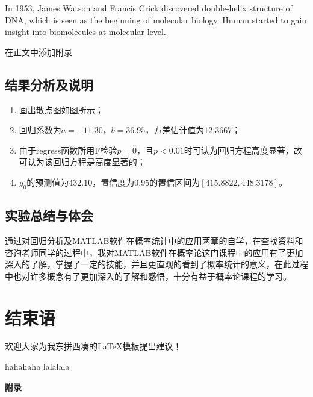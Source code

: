 \documentclass[UTF8,12pt,a4paper]{article}
\begin{document}
In 1953, James Watson and Francis Crick discovered double-helix structure of DNA, which is seen as the beginning of molecular biology. Human started to gain insight into biomolecules at molecular level.

\begin{appendices}
在正文中添加附录
\end{appendices}

\subsection{结果分析及说明}
\begin{enumerate}
	\item 画出散点图如图所示；
	\item 回归系数为$a=-11.30$，$b=36.95$，方差估计值为$12.3667$；
	\item 由于regress函数所用F检验$p=0$，且$p<0.01$时可认为回归方程高度显著，故可认为该回归方程是高度显著的；
	\item $y_0$的预测值为$432.10$，置信度为$0.95$的置信区间为$[415.8822,448.3178]$。
\end{enumerate}

\subsection{实验总结与体会}
通过对回归分析及MATLAB软件在概率统计中的应用两章的自学，在查找资料和咨询老师同学的过程中，我对MATLAB软件在概率论这门课程中的应用有了更加深入的了解，掌握了一定的技能，并且更直观的看到了概率统计的意义，在此过程中也对许多概念有了更加深入的了解和感悟，十分有益于概率论课程的学习。



\section{结束语}
欢迎大家为我东拼西凑的\LaTeX 模板提出建议！


\begin{thebibliography}{2}
	 hahahaha
	 lalalala
\end{thebibliography}
%
%



\appendix
\addappheadtotoc%

\newpage

\begin{center}
	\Huge\bfseries\heiti 附录 %
\end{center}
\end{document}
